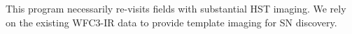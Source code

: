 This program necessarily re-visits fields with substantial HST
imaging. We rely on the existing WFC3-IR data to provide template
imaging for SN discovery.  

